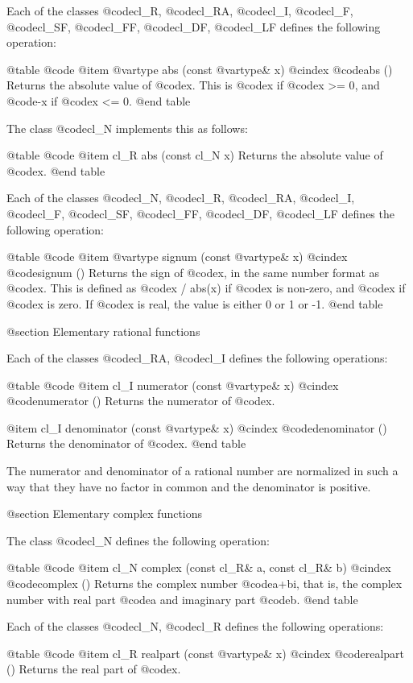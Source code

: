 Each of the classes @code{cl_R}, @code{cl_RA}, @code{cl_I},
@code{cl_F}, @code{cl_SF}, @code{cl_FF}, @code{cl_DF}, @code{cl_LF}
defines the following operation:

@table @code
@item @var{type} abs (const @var{type}& x)
@cindex @code{abs ()}
Returns the absolute value of @code{x}.
This is @code{x} if @code{x >= 0}, and @code{-x} if @code{x <= 0}.
@end table

The class @code{cl_N} implements this as follows:

@table @code
@item cl_R abs (const cl_N x)
Returns the absolute value of @code{x}.
@end table

Each of the classes @code{cl_N}, @code{cl_R}, @code{cl_RA}, @code{cl_I},
@code{cl_F}, @code{cl_SF}, @code{cl_FF}, @code{cl_DF}, @code{cl_LF}
defines the following operation:

@table @code
@item @var{type} signum (const @var{type}& x)
@cindex @code{signum ()}
Returns the sign of @code{x}, in the same number format as @code{x}.
This is defined as @code{x / abs(x)} if @code{x} is non-zero, and
@code{x} if @code{x} is zero. If @code{x} is real, the value is either
0 or 1 or -1.
@end table


@section Elementary rational functions

Each of the classes @code{cl_RA}, @code{cl_I} defines the following operations:

@table @code
@item cl_I numerator (const @var{type}& x)
@cindex @code{numerator ()}
Returns the numerator of @code{x}.

@item cl_I denominator (const @var{type}& x)
@cindex @code{denominator ()}
Returns the denominator of @code{x}.
@end table

The numerator and denominator of a rational number are normalized in such
a way that they have no factor in common and the denominator is positive.


@section Elementary complex functions

The class @code{cl_N} defines the following operation:

@table @code
@item cl_N complex (const cl_R& a, const cl_R& b)
@cindex @code{complex ()}
Returns the complex number @code{a+bi}, that is, the complex number with
real part @code{a} and imaginary part @code{b}.
@end table

Each of the classes @code{cl_N}, @code{cl_R} defines the following operations:

@table @code
@item cl_R realpart (const @var{type}& x)
@cindex @code{realpart ()}
Returns the real part of @code{x}.

